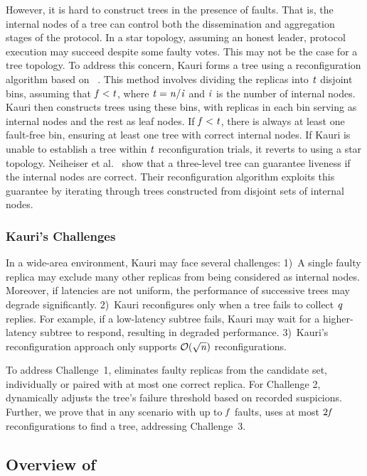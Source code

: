 However, it is hard to construct trees in the presence of faults.
That is, the internal nodes of a tree can control both the dissemination and aggregation stages of the protocol.
In a star topology, assuming an honest leader, protocol execution may succeed despite some faulty votes.
This may not be the case for a tree topology.
To address this concern, Kauri forms a \validt tree using a reconfiguration algorithm based on \tbc~\cite{kauri}.
This method involves dividing the replicas into $\mathit{t}$ disjoint bins, assuming that $\mathit{f}<\mathit{t}$, where $\mathit{t}=\mathit{n}/\mathit{i}$ and $\mathit{i}$ is the number of internal nodes.
Kauri then constructs trees using these bins, with replicas in each bin serving as internal nodes and the rest as leaf nodes.
If $\mathit{f}<\mathit{t}$, there is always at least one fault-free bin, ensuring at least one tree with correct internal nodes.
If Kauri is unable to establish a \validt tree within $\mathit{t}$ reconfiguration trials, it reverts to using a star topology.
Neiheiser et al.~\cite{kauri} show that a three-level tree can guarantee liveness if the internal nodes are correct.
Their reconfiguration algorithm exploits this guarantee by iterating through trees constructed from disjoint sets of internal nodes.

\subsubsection{Kauri's Challenges}

In a wide-area environment, Kauri may face several challenges:
1)~A single faulty replica may exclude many other replicas from being considered as internal nodes.
Moreover, if latencies are not uniform, the performance of successive trees may degrade significantly.
2)~Kauri reconfigures only when a tree fails to collect $\mathit{q}$ replies.
For example, if a low-latency subtree fails, Kauri may wait for a higher-latency subtree to respond, resulting in degraded performance.
3)~Kauri's reconfiguration approach only supports $\mathcal{O}(\sqrt{\mathit{n}})$ reconfigurations.

To address Challenge~1, \optitree eliminates faulty replicas from the candidate set, individually or paired with at most one correct replica.
For Challenge 2, \optitree dynamically adjusts the tree's failure threshold based on recorded suspicions.
Further, we prove that in any scenario with up to $\mathit{f}$ faults, \optitree uses at most $2\mathit{f}$ reconfigurations to find a \validt tree, addressing Challenge~3.

\subsection{Overview of \optitree}

